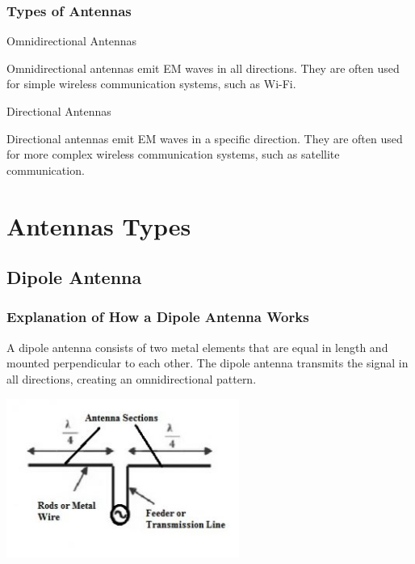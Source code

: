 \documentclass{beamer}
\begin{document}
\begin{frame}
  \frametitle{Types of Antennas}
  \begin{block}{Omnidirectional Antennas}

    Omnidirectional antennas emit EM waves in all directions. They are often used for simple wireless communication systems, such as Wi-Fi.
  \end{block}
  \begin{block}{Directional Antennas}

    Directional antennas emit EM waves in a specific direction. They are often used for more complex wireless communication systems, such as satellite communication.
  \end{block}
\end{frame}




\section{Antennas Types}

\subsection{Dipole Antenna}
\begin{frame}
    \frametitle{Explanation of How a Dipole Antenna Works}
    A dipole antenna consists of two metal elements that are equal in length and mounted perpendicular to each other. The dipole antenna transmits the signal in all directions, creating an omnidirectional pattern.
    \begin{center}
        
    \includegraphics[width=3in]{dipole.jpg}
    \end{center}
\end{frame}
\end{document}
